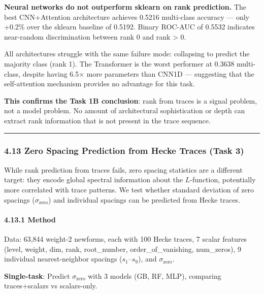 \documentclass[
]{article}
\begin{document}
\textbf{Neural networks do not outperform sklearn on rank prediction.}
The best CNN+Attention architecture achieves 0.5216 multi-class accuracy
--- only +0.2\% over the sklearn baseline of 0.5192. Binary ROC-AUC of
0.5532 indicates near-random discrimination between rank 0 and rank
\textgreater{} 0.

All architectures struggle with the same failure mode: collapsing to
predict the majority class (rank 1). The Transformer is the worst
performer at 0.3638 multi-class, despite having 6.5× more parameters
than CNN1D --- suggesting that the self-attention mechanism provides no
advantage for this task.

\textbf{This confirms the Task 1B conclusion}: rank from traces is a
signal problem, not a model problem. No amount of architectural
sophistication or depth can extract rank information that is not present
in the trace sequence.

\begin{center}\rule{0.5\linewidth}{0.5pt}\end{center}

\hypertarget{zero-spacing-prediction-from-hecke-traces-task-3}{%
\subsubsection{4.13 Zero Spacing Prediction from Hecke Traces (Task
3)}\label{zero-spacing-prediction-from-hecke-traces-task-3}}

While rank prediction from traces fails, zero spacing statistics are a
different target: they encode global spectral information about the
\(L\)-function, potentially more correlated with trace patterns. We test
whether standard deviation of zero spacings (\(\sigma_{\text{zero}}\))
and individual spacings can be predicted from Hecke traces.

\hypertarget{method-2}{%
\paragraph{4.13.1 Method}\label{method-2}}

Data: 63,844 weight-2 newforms, each with 100 Hecke traces, 7 scalar
features (level, weight, dim, rank, root\_number, order\_of\_vanishing,
num\_zeros), 9 individual nearest-neighbor spacings (\(s_1\)--\(s_9\)),
and \(\sigma_{\text{zero}}\).

\textbf{Single-task}: Predict \(\sigma_{\text{zero}}\) with 3 models
(GB, RF, MLP), comparing traces+scalars vs scalars-only.
\end{document}
